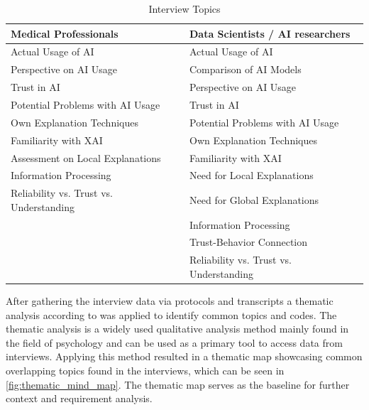 \documentclass[11pt,a4paper,english]{scrreprt}
\begin{document}
\begin{table}[htbp]
    \centering
    \begin{tabularx}{\textwidth}{ l l }
        \toprule
        Medical Professionals & Data Scientists / AI researchers \\
        \midrule
        Actual Usage of AI & Actual Usage of AI \\ 
        Perspective on AI Usage & Comparison of AI Models \\  
        Trust in AI & Perspective on AI Usage \\
        Potential Problems with AI Usage & Trust in AI \\
        Own Explanation Techniques & Potential Problems with AI Usage \\
        Familiarity with XAI & Own Explanation Techniques \\
        Assessment on Local Explanations & Familiarity with XAI \\
        Information Processing & Need for Local Explanations \\
        Reliability vs. Trust vs. Understanding & Need for Global Explanations \\
         & Information Processing \\
         & Trust-Behavior Connection \\
         & Reliability vs. Trust vs. Understanding \\
        \bottomrule
    \end{tabularx}
    \caption{Interview Topics}
    \label{table:interview_topics}
\end{table}

After gathering the interview data via protocols and transcripts a thematic analysis according to \textcite{braun_thematical_2006} was applied to identify common topics and codes. The thematic analysis is a widely used qualitative analysis method mainly found in the field of psychology and can be used as a primary tool to access data from interviews. Applying this method resulted in a thematic map showcasing common overlapping topics found in the interviews, which can be seen in \autoref{fig:thematic_mind_map}. The thematic map serves as the baseline for further context and requirement analysis.
\end{document}
